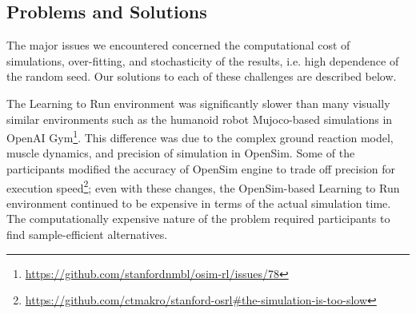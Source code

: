 \documentclass[graybox]{svmult}
\begin{document}
\subsection{Problems and Solutions}

The major issues we encountered concerned the computational cost of simulations, over-fitting, and stochasticity of the results, i.e. high dependence of the random seed. Our solutions to each of these challenges are described below.

The Learning to Run environment was significantly slower than many visually similar environments such as the humanoid robot Mujoco-based simulations in OpenAI Gym\footnote{\url{https://github.com/stanfordnmbl/osim-rl/issues/78}}. This difference was due to the complex ground reaction model, muscle dynamics, and precision of simulation in OpenSim. Some of the participants modified the accuracy of OpenSim engine to trade off precision for execution speed\footnote{\url{https://github.com/ctmakro/stanford-osrl\#the-simulation-is-too-slow}}; even with these changes, the OpenSim-based Learning to Run environment continued to be expensive in terms of the actual simulation time. The computationally expensive nature of the problem required participants to find sample-efficient alternatives.

\end{document}
